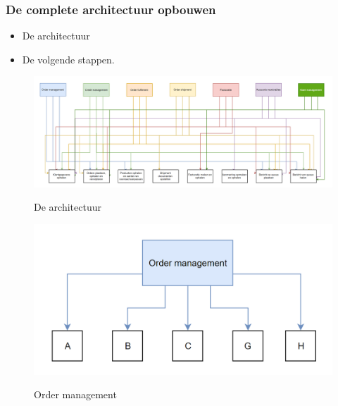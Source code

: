 \documentclass[aspectratio=169]{beamer}
\begin{document}
\begin{frame}
	\frametitle{De complete architectuur opbouwen}
	\begin{itemize}
		\item De architectuur
		\item De volgende stappen.
	\end{itemize}

\end{frame}

\begin{frame}
	\begin{figure}
		\caption{De architectuur}
		\includegraphics[height=.8\textheight]{img/schema_microservices.png}
		\label{img:microservices}
	\end{figure}
\end{frame}

\begin{frame}
	\begin{figure}
		\caption{Order management}
		\includegraphics[height=.8\textheight]{img/ordermanagement.png}
		\label{img:order_management}
	\end{figure}
\end{frame}
\end{document}
